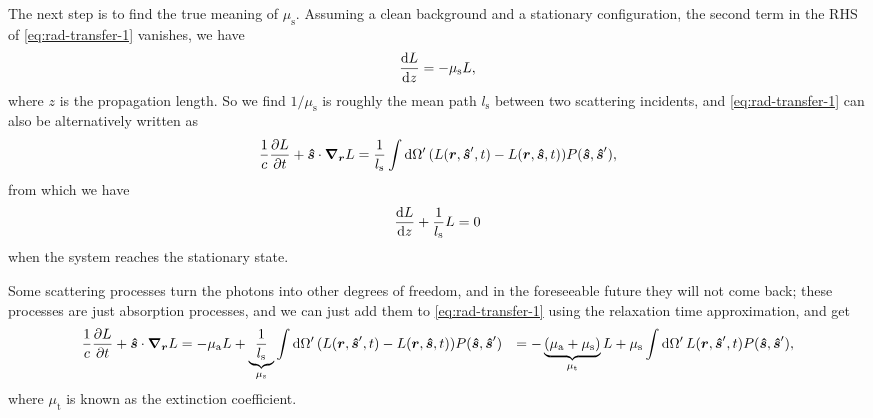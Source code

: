 \documentclass[hyperref, a4paper]{article}
\def\\{}%
\begin{document}
The next step is to find the true meaning of $\mu_{\text{s}}$. 
Assuming a clean background and a stationary configuration, 
the second term in the RHS of \eqref{eq:rad-transfer-1} vanishes, 
we have 
\[
    \dv{L}{z} = - \mu_{\text{s}} L, 
\]
where $z$ is the propagation length. 
So we find $1 / \mu_{\text{s}}$ is roughly 
the mean path $l_{\text{s}}$ between two scattering incidents, 
and \eqref{eq:rad-transfer-1} can also be alternatively written as 
\begin{equation}
    \frac{1}{c} \pdv{L}{t} + \vu*{s} \cdot \grad_{\vb*{r}} L = 
    \frac{1}{l_{\text{s}}} \int \dd{\Omega'} 
    (L(\vb*{r}, \vu*{s}', t) - L(\vb*{r}, \vu*{s}, t)) P(\vu*{s}, \vu*{s}'),
    \label{eq:rad-transfer-2}
\end{equation}
from which we have 
\begin{equation}
    \dv{L}{z} + \frac{1}{l_{\text{s}}} L = 0 
\end{equation}
when the system reaches the stationary state. 

Some scattering processes turn the photons into other degrees of freedom, 
and in the foreseeable future they will not come back; 
these processes are just absorption processes, 
and we can just add them to \eqref{eq:rad-transfer-1} 
using the relaxation time approximation, and get 
\begin{equation}
    \begin{aligned}
        \frac{1}{c} \pdv{L}{t} + \vu*{s} \cdot \grad_{\vb*{r}} L &= 
        - \mu_{\text{a}} L +
        \underbrace{\frac{1}{l_{\text{s}}}}_{\mu_{\text{s}}} \int \dd{\Omega'} 
        (L(\vb*{r}, \vu*{s}', t) - L(\vb*{r}, \vu*{s}, t)) P(\vu*{s}, \vu*{s}') \\
        &= - \underbrace{(\mu_{\text{a}} + \mu_{\text{s}})}_{\mu_{\text{t}}} L 
        + \mu_{\text{s}} \int \dd{\Omega'} 
        L(\vb*{r}, \vu*{s}', t) P(\vu*{s}, \vu*{s}') ,
    \end{aligned}
    \label{eq:rte-final}
\end{equation}
where $\mu_{\text{t}}$ is known as the extinction coefficient. 
\end{document}
